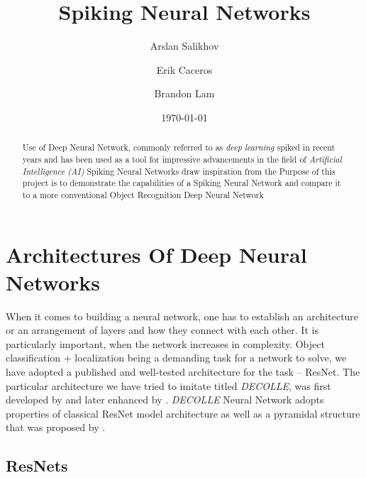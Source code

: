 \documentclass{article}
\title{Spiking Neural Networks}
\author{Arslan Salikhov \\
	\and 
	Erik Caceros \\
	\and
	Brandon Lam \\
	}
\date{\today}
\begin{document}
\begin{titlingpage}
\maketitle
\begin{abstract}
	Use of Deep Neural Network, commonly referred to as
	\emph{deep learning} spiked in recent years and has been used
	as a tool for impressive advancements in the field of 
	\emph{Artificial Intelligence (AI)}
	Spiking Neural Networks draw inspiration from the 
	Purpose of this project is to demonstrate the capabilities of a 
	Spiking Neural Network and compare it to a more conventional 
	Object Recognition Deep Neural Network
	\end{abstract}
\end{titlingpage}


\tableofcontents
\newpage




\section{Architectures Of Deep Neural Networks}

When it comes to building a neural network, one has to establish an
architecture or an arrangement of layers and how they connect with each other.
It is particularly important, when the network increases in complexity. Object
classification + localization being a demanding task for a network to solve,
we have adopted a published and well-tested architecture for the task --
ResNet. The particular architecture we have tried to imitate titled 
\textit{DECOLLE}, was first developed by  and later
enhanced by . \textit{DECOLLE} Neural Network adopts 
properties of classical ResNet model architecture as well as a pyramidal structure that
was proposed by . 

\subsection{ResNets}
\end{document}
